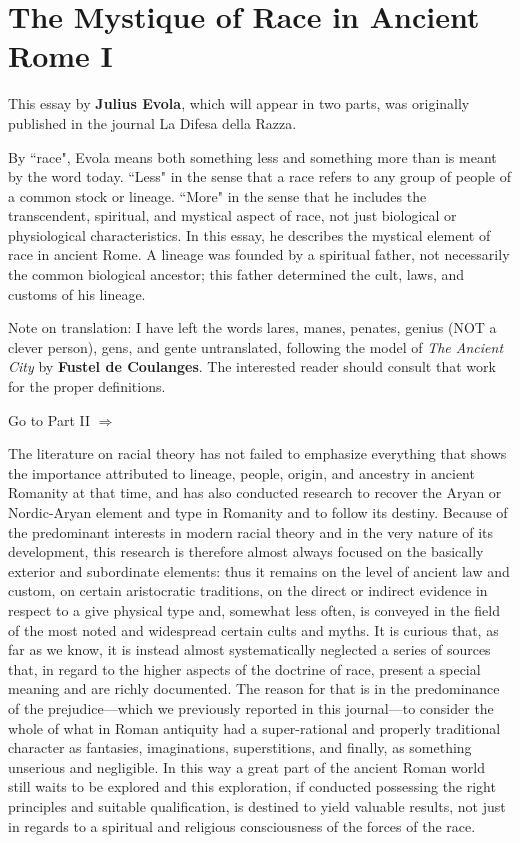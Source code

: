 \section{The Mystique of Race in Ancient Rome I}

\begin{quotex}
This essay by \textbf{Julius Evola}, which will appear in two parts, was originally published in the journal La Difesa della Razza.

By ``race", Evola means both something less and something more than is meant by the word today. ``Less" in the sense that a race refers to any group of people of a common stock or lineage. ``More" in the sense that he includes the transcendent, spiritual, and mystical aspect of race, not just biological or physiological characteristics. In this essay, he describes the mystical element of race in ancient Rome. A lineage was founded by a spiritual father, not necessarily the common biological ancestor; this father determined the cult, laws, and customs of his lineage.

Note on translation: I have left the words lares, manes, penates, genius (NOT a clever person), gens, and gente untranslated, following the model of \emph{The Ancient City} by \textbf{Fustel de Coulanges}. The interested reader should consult that work for the proper definitions.

Go to Part II $\Rightarrow $ 

\end{quotex}
The literature on racial theory has not failed to emphasize everything that shows the importance attributed to lineage, people, origin, and ancestry in ancient Romanity at that time, and has also conducted research to recover the Aryan or Nordic-Aryan element and type in Romanity and to follow its destiny. Because of the predominant interests in modern racial theory and in the very nature of its development, this research is therefore almost always focused on the basically exterior and subordinate elements: thus it remains on the level of ancient law and custom, on certain aristocratic traditions, on the direct or indirect evidence in respect to a give physical type and, somewhat less often, is conveyed in the field of the most noted and widespread certain cults and myths. It is curious that, as far as we know, it is instead almost systematically neglected a series of sources that, in regard to the higher aspects of the doctrine of race, present a special meaning and are richly documented. The reason for that is in the predominance of the prejudice—which we previously reported in this journal—to consider the whole of what in Roman antiquity had a super-rational and properly traditional character as fantasies, imaginations, superstitions, and finally, as something unserious and negligible. In this way a great part of the ancient Roman world still waits to be explored and this exploration, if conducted possessing the right principles and suitable qualification, is destined to yield valuable results, not just in regards to a spiritual and religious consciousness of the forces of the race.

